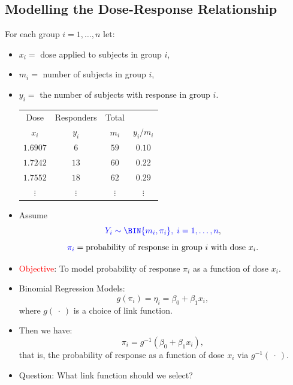 \documentclass[oneside]{book}\usepackage[]{graphicx}\usepackage[svgnames]{xcolor}
\begin{document}
\subsection*{Modelling the Dose-Response Relationship}
For each group $ i=1,\ldots,n $ let:
\begin{itemize}
      \item $ x_i= $ dose applied to subjects in group $ i $,
      \item $ m_i= $ number of subjects in group $ i $,
      \item $ y_i= $ the number of subjects with response in group $ i $.
            \begin{table}[!htbp]
                  \centering
                  \begin{tabular}{cccc}
                        \toprule
                        Dose       & Responders & Total                  \\
                        $ x_i $    & $ y_i $    & $ m_i $  & $ y_i/m_i $ \\
                        \midrule
                        $ 1.6907 $ & $ 6 $      & $ 59 $   & $ 0.10 $    \\
                        $ 1.7242 $ & $ 13 $     & $ 60 $   & $ 0.22 $    \\
                        $ 1.7552 $ & $ 18 $     & $ 62 $   & $ 0.29 $    \\
                        $\vdots$   & $\vdots$   & $\vdots$ & $\vdots$    \\
                        \bottomrule
                  \end{tabular}
            \end{table}
      \item Assume
            \[ \textcolor{Blue}{Y_i \sim \BIN{m_i,\pi_i},\; i=1,\ldots,n}, \]
            \[ \textcolor{Blue}{\pi_i} = \text{probability of response in group $ i $ with dose $ x_i $}. \]
      \item \textcolor{Red}{Objective}: To model probability of response $ \pi_i $ as a function of dose $ x_i $.
      \item Binomial Regression Models:
            \[ g(\pi_i)=\eta_i=\beta_0+\beta_1x_i, \]
            where $ g(\:\cdot\:) $ is a choice of link function.
      \item Then we have:
            \[ \pi_i=g^{-1}(\beta_0+\beta_1x_i), \]
            that is, the probability of response as a function of dose $ x_i $ via $ g^{-1}(\:\cdot\:) $.
      \item Question: What link function should we select?

\end{itemize}
\end{document}
